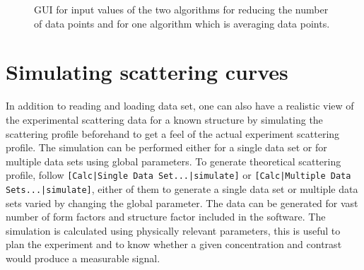 \begin{figure}[htb]
\captionsetup[subfigure]{position=b}
\centering
{}
\hfill
{}
\hfill
{}
\caption{GUI for input values of the two algorithms for reducing the number of data points and for one algorithm which is averaging data points.}
\label{fig:DataReductionOption}
\end{figure}

\section{Simulating scattering curves}

In addition to reading and loading data set, one can also have a
realistic view of the experimental scattering data for a known
structure by simulating the scattering profile beforehand to get a
feel of the actual experiment scattering profile. The simulation can
be performed either for a single data set or for multiple data sets
using global parameters. To generate theoretical scattering profile,
follow \verb"[Calc|Single Data Set...|simulate]" or
\verb"[Calc|Multiple Data Sets...|simulate]", either of them to generate
a single data set or multiple data sets varied by changing the global parameter. The
data can be generated for vast number of form factors and structure
factor included in the software. The simulation is calculated using
physically relevant parameters, this is useful to plan the
experiment and to know whether a given concentration and contrast
would produce a measurable signal.

